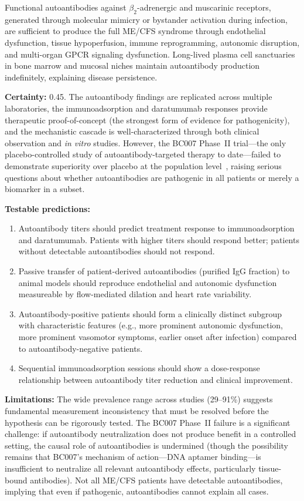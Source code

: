 \begin{hypothesis}
\label{hyp:gpcr-root}
Functional autoantibodies against $\beta_2$-adrenergic and muscarinic receptors, generated through molecular mimicry or bystander activation during infection, are sufficient to produce the full ME/CFS syndrome through endothelial dysfunction, tissue hypoperfusion, immune reprogramming, autonomic disruption, and multi-organ GPCR signaling dysfunction. Long-lived plasma cell sanctuaries in bone marrow and mucosal niches maintain autoantibody production indefinitely, explaining disease persistence.

\textbf{Certainty:} 0.45. The autoantibody findings are replicated across multiple laboratories, the immunoadsorption and daratumumab responses provide therapeutic proof-of-concept (the strongest form of evidence for pathogenicity), and the mechanistic cascade is well-characterized through both clinical observation and \emph{in vitro} studies. However, the BC007 Phase~II trial---the only placebo-controlled study of autoantibody-targeted therapy to date---failed to demonstrate superiority over placebo at the population level~\cite{Hohberger2021bc007}, raising serious questions about whether autoantibodies are pathogenic in all patients or merely a biomarker in a subset.

\textbf{Testable predictions:}
\begin{enumerate}
    \item Autoantibody titers should predict treatment response to immunoadsorption and daratumumab. Patients with higher titers should respond better; patients without detectable autoantibodies should not respond.
    \item Passive transfer of patient-derived autoantibodies (purified IgG fraction) to animal models should reproduce endothelial and autonomic dysfunction measureable by flow-mediated dilation and heart rate variability.
    \item Autoantibody-positive patients should form a clinically distinct subgroup with characteristic features (e.g., more prominent autonomic dysfunction, more prominent vasomotor symptoms, earlier onset after infection) compared to autoantibody-negative patients.
    \item Sequential immunoadsorption sessions should show a dose-response relationship between autoantibody titer reduction and clinical improvement.
\end{enumerate}

\textbf{Limitations:} The wide prevalence range across studies (29--91\%) suggests fundamental measurement inconsistency that must be resolved before the hypothesis can be rigorously tested. The BC007 Phase~II failure is a significant challenge: if autoantibody neutralization does not produce benefit in a controlled setting, the causal role of autoantibodies is undermined (though the possibility remains that BC007's mechanism of action---DNA aptamer binding---is insufficient to neutralize all relevant autoantibody effects, particularly tissue-bound antibodies). Not all ME/CFS patients have detectable autoantibodies, implying that even if pathogenic, autoantibodies cannot explain all cases.
\end{hypothesis}


